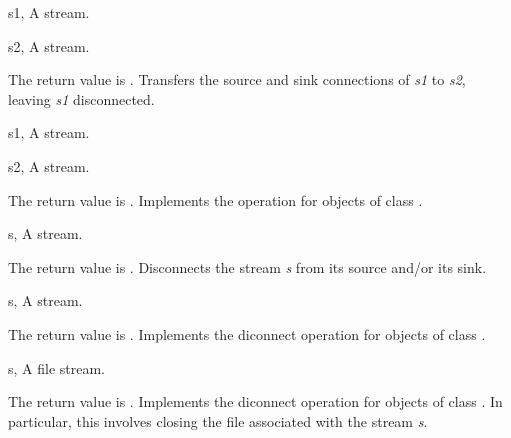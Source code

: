\begin{optDefinition}
\begin{genericargs}
    \item[s1, \classref{stream}] A stream.
    \item[s2, \classref{stream}] A stream.
\end{genericargs}
%
\result%
The return value is \nil{}.
%
\remarks%
Transfers the source and sink connections of {\em s1\/} to {\em s2},
leaving {\em s1\/} disconnected.

\begin{specargs}
    \item[s1, \classref{stream}] A stream.
    \item[s2, \classref{stream}] A stream.
\end{specargs}
%
\result%
The return value is \nil{}.
%
\remarks%
Implements the  operation for objects of class
.

\begin{genericargs}
    \item[s, \classref{stream}] A stream.
\end{genericargs}
%
\result%
The return value is \nil{}.
%
\remarks%
Disconnects the stream {\em s\/} from its source and/or its sink.

\begin{specargs}
    \item[s, \classref{stream}] A stream.
\end{specargs}
%
\result%
The return value is \nil{}.
%
\remarks%
Implements the diconnect operation for objects of class .

\begin{specargs}
    \item[s, \classref{file-stream}] A file stream.
\end{specargs}
%
\result%
The return value is \nil{}.
%
\remarks%
Implements the diconnect operation for objects of class
. In particular, this involves closing the file associated
with the stream {\em s}.


\end{optDefinition}
